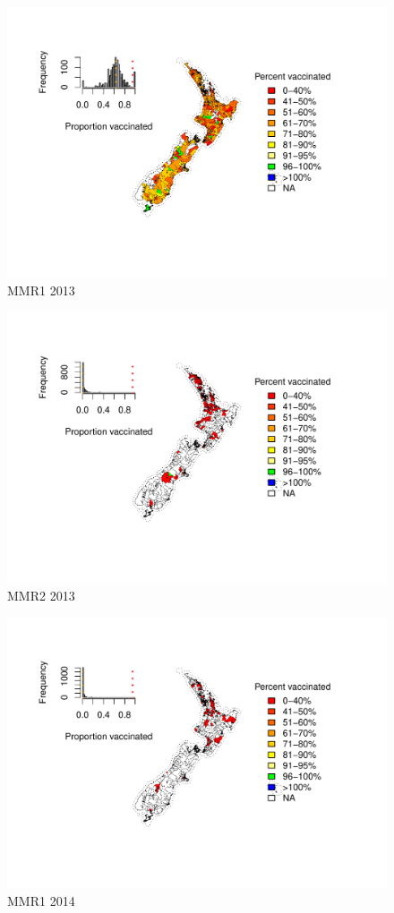 \documentclass{article}
\begin{document}
\begin{figure}
    \centering
    \includegraphics[width=5.0in]{nir_census_MMR1_NIR_2013.pdf}
    \caption{MMR1 2013}
\end{figure}

\begin{figure}
    \centering
    \includegraphics[width=5.0in]{nir_census_MMR2_NIR_2013.pdf}
    \caption{MMR2 2013}
\end{figure}


\begin{figure}
    \centering
    \includegraphics[width=5.0in]{nir_census_MMR1_NIR_2014.pdf}
    \caption{MMR1 2014}
\end{figure}
\end{document}
